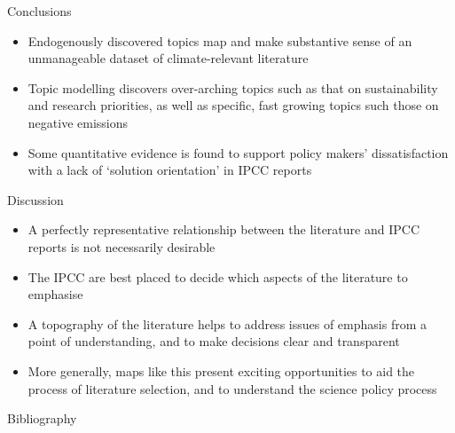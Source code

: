 \documentclass[9pt]{beamer}
\newcommand{\backupbegin}{
	\newcounter{finalframe}
	\setcounter{finalframe}{\value{framenumber}}
}
\begin{document}
\begin{frame}{Conclusions}


\begin{itemize}
	\item<1-> Endogenously discovered topics map and make substantive sense of an unmanageable dataset of climate-relevant literature
	\item<2-> Topic modelling discovers over-arching topics such as that on sustainability and research priorities, as well as specific, fast growing topics such those on negative emissions
	\item<3-> Some quantitative evidence is found to support policy makers' dissatisfaction with a lack of `solution orientation' in IPCC reports \citep{Kowarsch2017} 
\end{itemize}

\end{frame}

\begin{frame}{Discussion}


\begin{itemize}
\item<1-> A perfectly representative relationship between the literature and IPCC reports is not necessarily desirable
\item<2-> The IPCC are best placed to decide which aspects of the literature to emphasise
\item<3-> A topography of the literature helps to address issues of emphasis from a point of understanding, and to make decisions clear and transparent
\item<4-> More generally, maps like this present exciting opportunities to aid the process of literature selection, and to understand the science policy process
\end{itemize}

\end{frame}



\begin{frame}{Bibliography}
\small

\end{frame}


\appendix
\backupbegin
\end{document}
